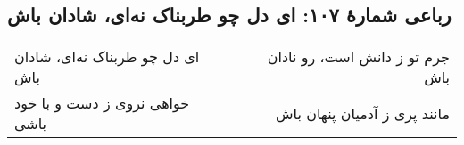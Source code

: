 \begin{center}
\section*{رباعی شمارهٔ ۱۰۷:  ای دل چو طربناک نه‌ای، شادان باش}
\label{sec:107}
\begin{longtable}{l p{0.5cm} r}
 ای دل چو طربناک نه‌ای، شادان باش
&&
جرم تو ز دانش است، رو نادان باش
\\
خواهی نروی ز دست و با خود باشی
&&
مانند پری ز آدمیان پنهان باش
\\
\end{longtable}
\end{center}
